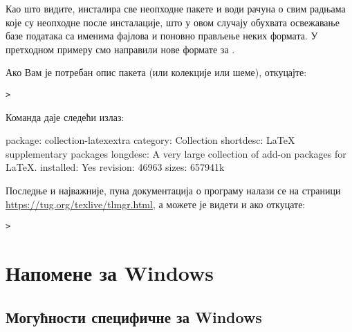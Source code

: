 \documentclass{article}
\begin{document}
Као што видите,  инсталира све неопходне пакете и води
рачуна о свим радњама које су неопходне после инсталације, што у овом
случају обухвата освежавање базе података са именима фајлова и
поновно прављење неких формата. У претходном примеру смо направили
нове формате за \XeTeX.

Ако Вам је потребан опис пакета (или колекције или шеме), откуцајте:
\begin{alltt}> 
\end{alltt}
Команда даје следећи излаз:
\begin{fverbatim}
package:    collection-latexextra
category:   Collection
shortdesc:  LaTeX supplementary packages
longdesc:   A very large collection of add-on packages for LaTeX.
installed:  Yes
revision:   46963
sizes:      657941k
\end{fverbatim}

Последње и најважније, пуна документација о програму 
налази се на страници \url{https://tug.org/texlive/tlmgr.html}, а
можете је видети и ако откуцате:
\begin{alltt}> 
\end{alltt}


\section{Напомене за Windows}
\label{sec:windows}


\subsection{Могућности специфичне за Windows}
\label{sec:winfeatures}
\end{document}
